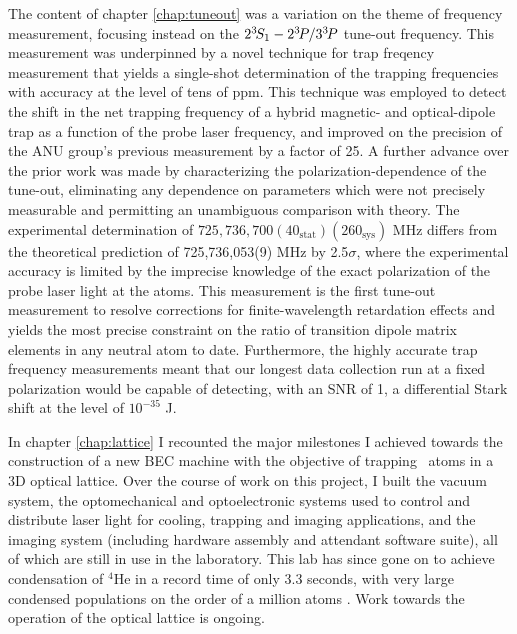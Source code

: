 	




	The content of chapter \ref{chap:tuneout} was a variation on the theme of frequency measurement, focusing instead on the $2^{3\!}S_1- 2^{3\!}P / 3^{3\!}P$ tune-out frequency.
	This measurement was underpinned by a novel technique for trap freqency measurement that yields a single-shot determination of the trapping frequencies with accuracy at the level of tens of ppm.
	This technique was employed to detect the shift in the net trapping frequency of a hybrid magnetic- and optical-dipole trap as a function of the probe laser frequency, and improved on the precision of the ANU group's previous measurement \cite{Henson15} by a factor of 25.
	A further advance over the prior work was made by characterizing the polarization-dependence of the tune-out, eliminating any dependence on parameters which were not precisely measurable and permitting an unambiguous comparison with theory.
	The experimental determination of $725,736,700(40_\mathrm{stat})(260_\mathrm{sys})$ MHz differs from the theoretical prediction of 725,736,053(9) MHz by 2.5$\sigma$, where the experimental accuracy is limited by the imprecise knowledge of the exact polarization of the probe laser light at the atoms.
	This measurement is the first tune-out measurement to resolve corrections for finite-wavelength retardation effects and yields the most precise constraint on the ratio of transition dipole matrix elements in any neutral atom to date.
	Furthermore, the highly accurate trap frequency measurements meant that our longest data collection run at a fixed polarization would be capable of detecting, with an SNR of 1, a differential Stark shift at the level of $10^{-35}$ J.


	In chapter \ref{chap:lattice} I recounted the major milestones I achieved towards the construction of a new BEC machine with the objective of trapping \mhe~atoms in a 3D optical lattice.
	Over the course of work on this project, I built the vacuum system, the optomechanical and optoelectronic systems used to control and distribute laser light for cooling, trapping and imaging applications, and the imaging system (including hardware assembly and attendant software suite), all of which are still in use in the laboratory.
	This lab has since gone on to achieve condensation of $^4$He in a record time of only 3.3 seconds, with very large condensed populations on the order of a million atoms \cite{Abbas21}.
	Work towards the operation of the optical lattice is ongoing.

